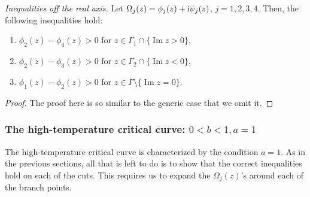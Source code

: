 \documentclass[pdftex]{sigma}
\numberwithin{equation}{section}
\begin{document}
\begin{prop}
 \textit{Inequalities off the real axis.}
 Let $\Omega_j(z) = \phi_j(z) + {\rm i}\psi_j(z)$, $j = 1,2,3,4$. Then, the following inequalities hold:
 \begin{enumerate}\itemsep=0pt
 \item $\phi_2(z) - \phi_4(z) > 0$ for $z \in \Gamma_1 \cap \{\operatorname{Im} z > 0\}$,
 \item $\phi_2(z) - \phi_3(z) > 0$ for $z \in \Gamma_2 \cap \{\operatorname{Im} z < 0\}$,
 \item $\phi_1(z) - \phi_2(z) > 0$ for $z \in \Gamma \setminus \{\operatorname{Im} z = 0\}$.
 \end{enumerate}
\end{prop}
\begin{proof}
 The proof here is so similar to the generic case that we omit it.
\end{proof}

\subsubsection{The high-temperature critical curve: $0< b < 1, a = 1$}
The high-temperature critical curve is characterized by the condition $a=1$. As in the previous sections, all that is left to do is to show that the correct inequalities hold on each of the cuts. This requires us to expand the $\Omega_j(z)$'s around each of the branch points.
\end{document}
